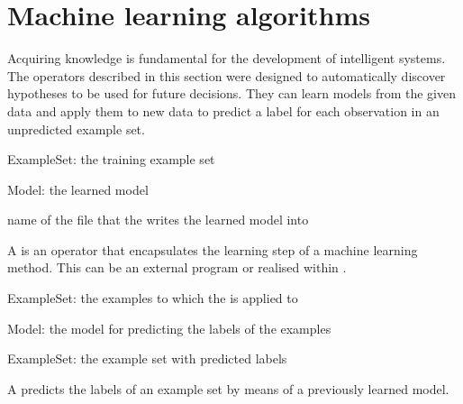 \section{Machine learning algorithms}


Acquiring knowledge is fundamental for the development of intelligent
systems. The operators described in this section were designed to
automatically discover hypotheses to be used for future
decisions. They can learn models from the given data and apply them to
new data to predict a label for each observation in an unpredicted
example set.




\newcommand{\learnerio}{
\begin{opin}
\item[ExampleSet:] the training example set
\end{opin}

\begin{opout}
\item[Model:] the learned model
\end{opout}
}
\learnerio

\begin{parameters}
 name of the file that the  writes the learned model into
\end{parameters}

\opdescr A  is an operator that encapsulates the learning
step of a machine learning method. This can be an external program or
realised within \rapidminer.



\newcommand{\applierio}{
\begin{opin}
\item[ExampleSet:] the examples to which the \ioobj{model} is applied to
\item[Model:] the model for predicting the labels of the examples
\end{opin}

\begin{opout}
\item[ExampleSet:] the example set with predicted labels
\end{opout}
}
\applierio

\opdescr A  predicts the labels of an example set by
means of a previously learned model.




